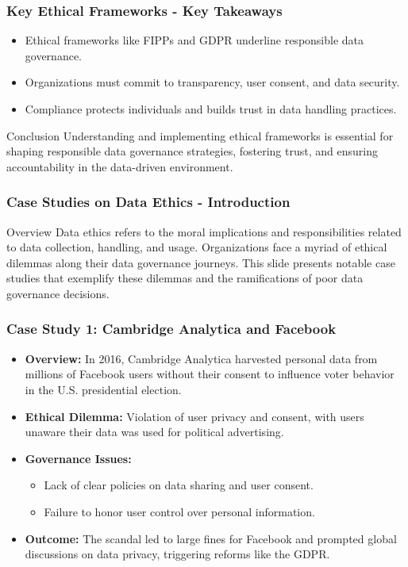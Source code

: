 \documentclass[aspectratio=169]{beamer}
\begin{document}
\begin{frame}[fragile]
    \frametitle{Key Ethical Frameworks - Key Takeaways}
    \begin{itemize}
        \item Ethical frameworks like FIPPs and GDPR underline responsible data governance.
        \item Organizations must commit to transparency, user consent, and data security.
        \item Compliance protects individuals and builds trust in data handling practices.
    \end{itemize}

    \begin{block}{Conclusion}
        Understanding and implementing ethical frameworks is essential for shaping responsible data governance strategies, fostering trust, and ensuring accountability in the data-driven environment.
    \end{block}
\end{frame}

\begin{frame}[fragile]
  \frametitle{Case Studies on Data Ethics - Introduction}
  \begin{block}{Overview}
    Data ethics refers to the moral implications and responsibilities related to data collection, handling, and usage. Organizations face a myriad of ethical dilemmas along their data governance journeys. This slide presents notable case studies that exemplify these dilemmas and the ramifications of poor data governance decisions.
  \end{block}
\end{frame}

\begin{frame}[fragile]
  \frametitle{Case Study 1: Cambridge Analytica and Facebook}
  \begin{itemize}
    \item \textbf{Overview:} In 2016, Cambridge Analytica harvested personal data from millions of Facebook users without their consent to influence voter behavior in the U.S. presidential election.
    
    \item \textbf{Ethical Dilemma:} Violation of user privacy and consent, with users unaware their data was used for political advertising.
    
    \item \textbf{Governance Issues:}
      \begin{itemize}
        \item Lack of clear policies on data sharing and user consent.
        \item Failure to honor user control over personal information.
      \end{itemize}
    
    \item \textbf{Outcome:} The scandal led to large fines for Facebook and prompted global discussions on data privacy, triggering reforms like the GDPR.
  \end{itemize}
\end{frame}
\end{document}
